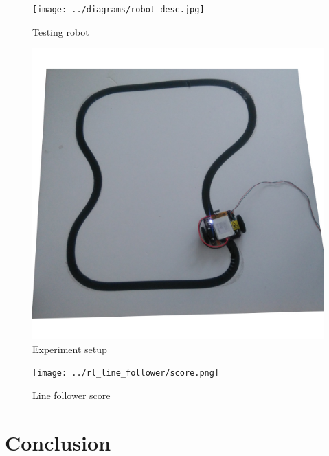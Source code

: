 \documentclass[10pt,a4paper]{article}
\begin{document}
\begin{figure}[ht]
\centering
\begin{minipage}[b]{.6\textwidth}
\hspace*{-4cm}
  \centering
  \texttt{[image: ../diagrams/robot\_desc.jpg]}
  \caption{Testing robot}
  \label{fig:testing_robot}

\end{minipage} %
\begin{minipage}[b]{.3\textwidth}
\hspace*{-2cm}
\centering
 \includegraphics[scale=0.2]{../diagrams/environment.jpg}
 \caption{Experiment setup}
 \label{fig:experiment_setup}

\end{minipage}
\end{figure}


\begin{figure}[ht]
  \centering
  \texttt{[image: ../rl\_line\_follower/score.png]}
  \caption{Line follower score}
  \label{fig:line_follower_score}
\end{figure}




\newpage
\section{Conclusion}
\end{document}
